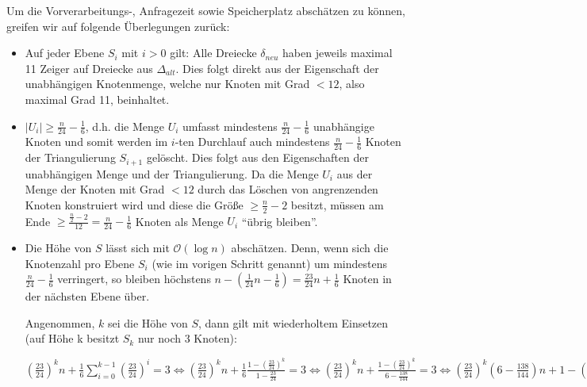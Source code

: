 \documentclass[a4paper]{article}
\begin{document}
Um die Vorverarbeitungs-, Anfragezeit sowie Speicherplatz abschätzen zu können, greifen wir auf folgende Überlegungen zurück:

\begin{itemize}
\item Auf jeder Ebene $S_i$ mit $i > 0$ gilt: Alle Dreiecke $\delta_{neu}$ haben jeweils maximal 11 Zeiger auf Dreiecke aus $\Delta_{alt}$. Dies folgt direkt aus der Eigenschaft der unabhängigen Knotenmenge, welche nur Knoten mit Grad $ < 12$, also maximal Grad 11, beinhaltet. 

\item $|U_i| \geq \frac{n}{24} - \frac{1}{6}$, d.h. die Menge $U_i$ umfasst mindestens $\frac{n}{24} - \frac{1}{6}$ unabhängige Knoten und somit werden im $i$-ten Durchlauf auch mindestens $\frac{n}{24} - \frac{1}{6}$ Knoten der Triangulierung $S_{i+1}$ gelöscht. Dies folgt aus den Eigenschaften der unabhängigen Menge und der Triangulierung. Da die Menge $U_i$ aus der Menge der Knoten mit Grad $< 12$
durch das Löschen von angrenzenden Knoten konstruiert wird und diese die Größe $\geq \frac{n}{2}-2$ besitzt, müssen am Ende $\geq \frac{\frac{n}{2}-2}{12} = \frac{n}{24} - \frac{1}{6}$ Knoten als Menge $U_i$ "`übrig bleiben"'.

\item Die Höhe von $S$ lässt sich mit $\mathcal{O}(\log n)$ abschätzen. Denn, wenn sich die Knotenzahl
pro Ebene $S_i$ (wie im vorigen Schritt genannt) um mindestens $\frac{n}{24} - \frac{1}{6}$ verringert, so bleiben höchstens $n - (\frac{1}{24} n - \frac{1}{6}) = \frac{23}{24} n + \frac{1}{6}$ Knoten in
der nächsten Ebene über. 

Angenommen, $k$ sei die Höhe von $S$, dann gilt mit wiederholtem Einsetzen (auf Höhe k besitzt $S_k$ nur noch 3 Knoten): 

$(\frac{23}{24})^k n + \frac{1}{6} \sum_{i = 0}^{k-1} (\frac{23}{24})^i = 3 
\Leftrightarrow 
(\frac{23}{24})^k n + \frac{1}{6} \frac{1-(\frac{23}{24})^k}{1- \frac{23}{24}} = 3
\Leftrightarrow 
(\frac{23}{24})^k n + \frac{1-(\frac{23}{24})^k}{6- \frac{138}{144}} = 3
\Leftrightarrow 
(\frac{23}{24})^k (6- \frac{138}{144}) n + 1-(\frac{23}{24})^k = 3 (6- \frac{138}{144})
\Leftrightarrow 
(\frac{23}{24})^k ((6- \frac{138}{144}) n - 1) = 3 (6- \frac{138}{144}) - 1
\Leftrightarrow 
(\frac{23}{24})^k = \frac{3 (6- \frac{138}{144}) - 1}{((6- \frac{138}{144}) n - 1) }
\Leftrightarrow 
k = \log_{\frac{23}{24}}\frac{3 (6- \frac{138}{144}) - 1}{((6- \frac{138}{144}) n - 1) }
= \mathcal{O}(\log n).
$

\end{itemize} 
\end{document}
